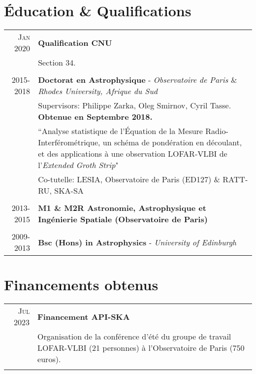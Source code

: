 \section{\'Education \& Qualifications}

\begin{tabular}{r|p{15.5cm}}
	\textsc{Jan 2020} & \textbf{Qualification CNU}\\
	& Section 34.\\
	\multicolumn{2}{c}{} \\

\textsc{2015-2018} & \textbf{Doctorat en Astrophysique} - \textit{Observatoire de Paris $\&$ Rhodes University, Afrique du Sud}\\
& Supervisors: Philippe Zarka, Oleg Smirnov, Cyril Tasse. \textbf{Obtenue en Septembre 2018.}\\
& ``Analyse statistique de l’\'Equation de la Mesure Radio-Interférométrique, un schéma de pondération en découlant, et des applications à une observation LOFAR-VLBI de l’\textit{Extended Groth Strip}"\\
& Co-tutelle: LESIA, Observatoire de Paris (ED127) \& RATT-RU, SKA-SA\\
\multicolumn{2}{c}{} \\

\textsc{2013-2015} & \textbf{M1 \& M2R Astronomie, Astrophysique et Ingénierie Spatiale (Observatoire de Paris)} \\
\multicolumn{2}{c}{} \\


\textsc{2009-2013} & \textbf{Bsc (Hons) in Astrophysics} - \textit{University of Edinburgh} \\


\end{tabular}


\section{Financements obtenus}

\begin{tabular}{r|p{15.5cm}}
	\textsc{Jul 2023} & \textbf{Financement API-SKA}\\
	& Organisation de la conf\'erence d'\'et\'e du groupe de travail LOFAR-VLBI (21 personnes) \`a l'Observatoire de Paris (750 euros).\\
	\multicolumn{2}{c}{} \\

\end{tabular}


